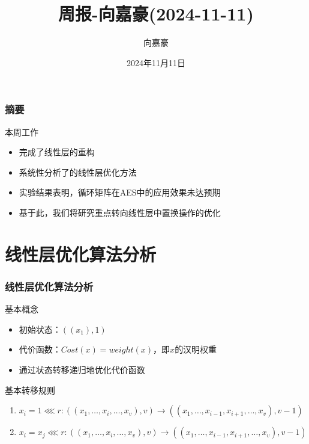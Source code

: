 \documentclass{beamer}
\title{\textbf{周报-向嘉豪(2024-11-11)}}
\author{向嘉豪}
\institute{衡阳师范学院}
\date{2024年11月11日}
\begin{document}
\begin{frame}
    \titlepage
\end{frame}

\begin{frame}
    \frametitle{摘要}
    \begin{block}{本周工作}
        \begin{itemize}
            \item 完成了线性层的重构
            \item 系统性分析了\cite{Leurent2024}的线性层优化方法
            \item 实验结果表明，循环矩阵在AES中的应用效果未达预期
            \item 基于此，我们将研究重点转向线性层中置换操作的优化
        \end{itemize}
    \end{block}
\end{frame}

\section{线性层优化算法分析}
\begin{frame}
    \frametitle{线性层优化算法分析}
    \begin{block}{基本概念}
        \begin{itemize}
            \item 初始状态：$((x_1), 1)$
            \item 代价函数：$Cost(x) = weight(x)$，即$x$的汉明权重
            \item 通过状态转移递归地优化代价函数
        \end{itemize}
    \end{block}
    \begin{block}{基本转移规则}
        \begin{enumerate}
            \item $x_{i} = 1 \lll r : ((x_1, \dots, x_{i}, \dots, x_v), v) \rightarrow ((x_1, \dots, x_{i-1}, x_{i+1}, \dots, x_v), v-1)$
            \item $x_{i} = x_{j} \lll r : ((x_1, \dots, x_{i}, \dots, x_v), v) \rightarrow ((x_1, \dots, x_{i-1}, x_{i+1}, \dots, x_v), v-1)$
        \end{enumerate}
    \end{block}
\end{frame}
\end{document}
